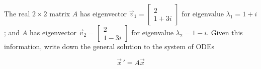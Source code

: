 \documentclass[addpoints,12pt]{exam}
\newcommand{\vv}[2]{\begin{bmatrix} #1 \\ #2 \end{bmatrix}}
\begin{document}
\begin{questions}
 
 \newpage
 
 \question[3] The real $2\times2$ matrix $A$  has eigenvector $\vec v_1=\vv{2}{1+3i}$ for eigenvalue $\lambda_1=1+i$; and $A$ has eigenvector  $\vec v_2=\vv{2}{1-3i}$ for eigenvalue $\lambda_2=1-i$. Given this information, write down the general solution to the system of ODEs
 
 $$\vec x\,'=A\vec x$$
 
 
 
 
 
\end{questions}
\end{document}
